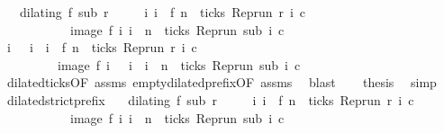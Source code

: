 \begin{isabellebody}
\ \ \ {\isacartoucheopen}dilating\ f\ sub\ r{\isacartoucheclose}\isanewline
\ \ \ \ \ {\isacartoucheopen}{\isacharbraceleft}i{\isachardot}\ i\ {\isasymle}\ f\ n\ {\isasymand}\ ticks\ {\isacharparenleft}{\isacharparenleft}Rep{\isacharunderscore}run\ r{\isacharparenright}\ i\ c{\isacharparenright}{\isacharbraceright}\isanewline
\ \ \ \ \ \ \ \ \ \ {\isacharequal}\ image\ f\ {\isacharbraceleft}i{\isachardot}\ i\ {\isasymle}\ n\ {\isasymand}\ ticks\ {\isacharparenleft}{\isacharparenleft}Rep{\isacharunderscore}run\ sub{\isacharparenright}\ i\ c{\isacharparenright}{\isacharbraceright}{\isacartoucheclose}\isanewline
%
\isadelimproof
%
\endisadelimproof
%
\isatagproof
{}\isamarkupfalse%
\ {\isacharminus}\isanewline
\ \ \isamarkupfalse%
\ {\isacartoucheopen}{\isacharbraceleft}i{\isachardot}\ {}\ {\isasymle}\ i\ {\isasymand}\ i\ {\isasymle}\ f\ n\ {\isasymand}\ ticks\ {\isacharparenleft}{\isacharparenleft}Rep{\isacharunderscore}run\ r{\isacharparenright}\ i\ c{\isacharparenright}{\isacharbraceright}\isanewline
\ \ \ \ \ \ \ \ {\isacharequal}\ image\ f\ {\isacharbraceleft}i{\isachardot}\ {}\ {\isasymle}\ i\ {\isasymand}\ i\ {\isasymle}\ n\ {\isasymand}\ ticks\ {\isacharparenleft}{\isacharparenleft}Rep{\isacharunderscore}run\ sub{\isacharparenright}\ i\ c{\isacharparenright}{\isacharbraceright}{\isacartoucheclose}\isanewline
\ \ \ \ \isamarkupfalse%
\ dilated{\isacharunderscore}ticks{\isacharbrackleft}OF\ assms{\isacharbrackright}\ empty{\isacharunderscore}dilated{\isacharunderscore}prefix{\isacharprime}{\isacharbrackleft}OF\ assms{\isacharbrackright}\ \isamarkupfalse%
\ blast\isanewline
\ \ \isamarkupfalse%
\ {\isacharquery}thesis\ \isamarkupfalse%
\ simp\isanewline
{}\isamarkupfalse%
%
\endisatagproof
{\isafoldproof}%
%
\isadelimproof
\isanewline
%
\endisadelimproof
\isanewline
{}\isamarkupfalse%
\ dilated{\isacharunderscore}strict{\isacharunderscore}prefix{\isacharcolon}\isanewline
\ \ \ {\isacartoucheopen}dilating\ f\ sub\ r{\isacartoucheclose}\isanewline
\ \ \ \ \ {\isacartoucheopen}{\isacharbraceleft}i{\isachardot}\ i\ {\isacharless}\ f\ n\ {\isasymand}\ ticks\ {\isacharparenleft}{\isacharparenleft}Rep{\isacharunderscore}run\ r{\isacharparenright}\ i\ c{\isacharparenright}{\isacharbraceright}\isanewline
\ \ \ \ \ \ \ \ \ \ {\isacharequal}\ image\ f\ {\isacharbraceleft}i{\isachardot}\ i\ {\isacharless}\ n\ {\isasymand}\ ticks\ {\isacharparenleft}{\isacharparenleft}Rep{\isacharunderscore}run\ sub{\isacharparenright}\ i\ c{\isacharparenright}{\isacharbraceright}{\isacartoucheclose}\isanewline

\end{isabellebody}

